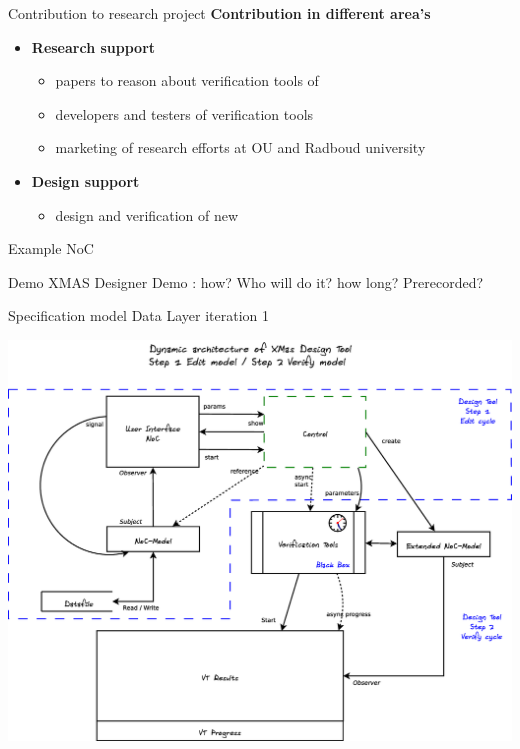 \documentclass[11pt]{beamer}
\begin{document}
\begin{frame}{Contribution to research project}
	\textbf{Contribution in different area's}
	\begin{itemize}
		\item {\bf Research support}
		\begin{itemize}
			\item papers to reason about verification tools of \Noc
			\item developers and testers of verification tools
			\item marketing of research efforts at OU and Radboud university
		\end{itemize}
		\item {\bf Design support}
		\begin{itemize}
			\item design and verification of new \Noc
		\end{itemize}
	\end{itemize}

\end{frame}

\begin{frame}{Example NoC}

\end{frame}

\begin{frame}{Demo XMAS Designer}
	Demo : how? Who will do it? how long? Prerecorded?
\end{frame}

\begin{frame}{Specification model Data Layer iteration 1}

	\includegraphics[width=.80\linewidth]{pictures/1c-architecture-dynamic-1}

\end{frame}
\end{document}

